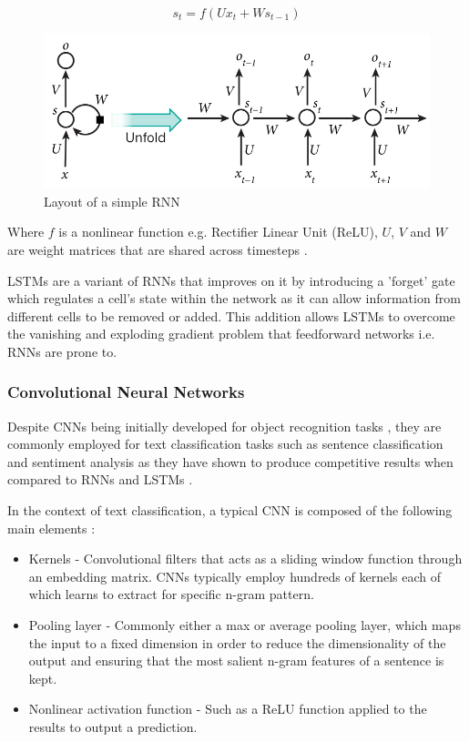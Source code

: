 \documentclass[a4paper,twoside,phd]{BYUPhys}
\begin{document}
\begin{equation}
s_t = f(Ux_t + Ws_{t-1})
\label{eq:HiddenState}
\end{equation}

\begin{figure}[H]
	\centering
	\includegraphics[totalheight=6cm]{images/RNN.jpg}
	\caption{Layout of a simple RNN \cite{RNNDiagram}}
	\label{fig:RNN}
\end{figure}

Where $f$ is a nonlinear function e.g. Rectifier Linear Unit (ReLU), $U$, $V$ and $W$ are weight matrices that are shared across timesteps \cite{Young}. \newline

LSTMs \cite{Hochreiter1997} are a variant of RNNs that improves on it by introducing a 'forget' gate which regulates a cell's state within the network as it can allow information from different cells to be removed or added. This addition allows LSTMs to overcome the vanishing and exploding gradient problem \cite{Socher} that feedforward networks i.e. RNNs are prone to.

\subsubsection{Convolutional Neural Networks}
\label{sec:CNN}

Despite CNNs being initially developed for object recognition tasks \cite{LeCun1999}, they are commonly employed for text classification tasks such as sentence classification and sentiment analysis as they have shown to produce competitive results when compared to RNNs and LSTMs \cite{Collobert2011} \cite{Kim} \cite{Nogueira}. \newline

In the context of text classification, a typical CNN is composed of the following main elements \cite{Young}:

\begin{itemize}
	\item Kernels - Convolutional filters that acts as a sliding window function through an embedding matrix. CNNs typically employ hundreds of kernels each of which learns to extract for specific n-gram pattern.
	\item Pooling layer - Commonly either a max or average pooling layer, which maps the input to a fixed dimension in order to reduce the dimensionality of the output and ensuring that the most salient n-gram features of a sentence is kept.
	\item Nonlinear activation function - Such as a ReLU function applied to the results to output a prediction.
\end{itemize}
\end{document}
